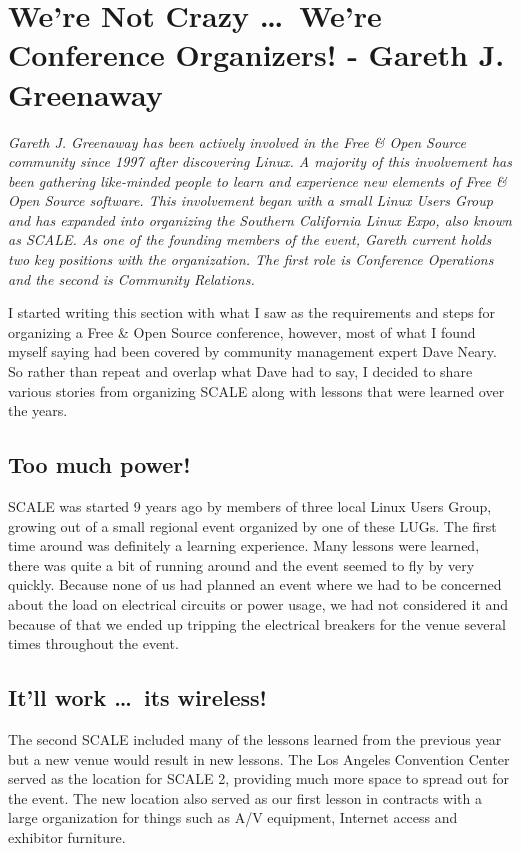 \chapter{We're Not Crazy \dots\ We're Conference Organizers! - Gareth J.
Greenaway}

\textit{Gareth J. Greenaway has been actively involved in the Free \& Open Source community since 1997 after discovering Linux. A majority of this involvement has been gathering like-minded people to learn and experience new elements of Free \& Open Source software. This involvement began with a small Linux Users Group and has expanded into organizing the Southern California Linux Expo, also known as SCALE. As one of the founding members of the event, Gareth current holds two key positions with the organization. The first role is Conference Operations and the second is Community Relations.}

I started writing this section with what I saw as the requirements and steps for
organizing a Free \& Open Source conference, however, most of what I found myself saying had been covered by community management expert Dave Neary. So rather than repeat and overlap what Dave had to say, I decided to share various stories from organizing SCALE along with lessons that were learned over the years.

\section*{Too much power!}

SCALE was started 9 years ago by members of three local Linux Users Group,
growing out of a small regional event organized by one of these LUGs. The first
time around was definitely a learning experience. Many lessons were learned,
there was quite a bit of running around and the event seemed to fly by very
quickly. Because none of us had planned an event where we had to be
concerned about the load on electrical circuits or power usage, we had not
considered it and because of that we ended up tripping the electrical breakers
for the venue several times throughout the event.

\section*{It’ll work \dots\ its wireless!}

The second SCALE included many of the lessons learned from the previous year but
a new venue would result in new lessons. The Los Angeles Convention Center
served as the location for SCALE 2, providing much more space to spread out for
the event. The new location also served as our first lesson in contracts with a
large organization for things such as A/V equipment, Internet access and
exhibitor furniture.  

